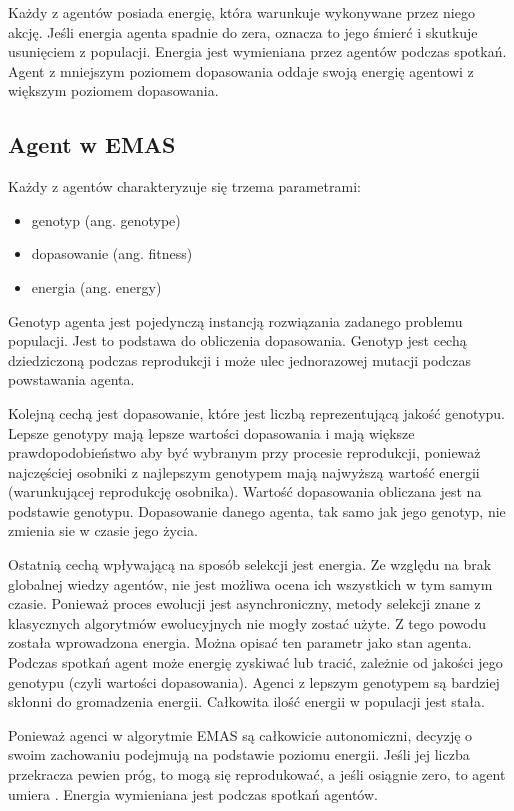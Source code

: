 Każdy z agentów posiada energię, która warunkuje wykonywane przez niego akcję. Jeśli energia agenta spadnie do zera, oznacza to jego śmierć i skutkuje usunięciem z populacji. Energia jest wymieniana przez agentów podczas spotkań. Agent z mniejszym poziomem dopasowania oddaje swoją energię agentowi z większym poziomem dopasowania.

\subsection*{Agent w EMAS}
\label{sec:agentgenetyczny}
Każdy z agentów charakteryzuje się trzema parametrami:
\begin {itemize}
\item genotyp (ang. genotype)
\item dopasowanie (ang. fitness)
\item energia (ang. energy)
\end {itemize}
Genotyp agenta jest pojedynczą instancją rozwiązania zadanego problemu populacji. Jest to podstawa do obliczenia dopasowania. Genotyp jest cechą dziedziczoną podczas reprodukcji i może ulec jednorazowej mutacji podczas powstawania agenta.

Kolejną cechą jest dopasowanie, które jest liczbą reprezentującą jakość genotypu. Lepsze genotypy mają lepsze wartości dopasowania i mają większe prawdopodobieństwo aby być wybranym przy procesie reprodukcji, ponieważ najczęściej osobniki z najlepszym genotypem mają najwyższą wartość energii (warunkującej reprodukcję osobnika). Wartość dopasowania obliczana jest na podstawie genotypu. Dopasowanie danego agenta, tak samo jak jego genotyp, nie zmienia sie w czasie jego życia.

Ostatnią cechą wpływającą na sposób selekcji jest energia. Ze względu na brak globalnej wiedzy agentów, nie jest możliwa ocena ich wszystkich w tym samym czasie. Ponieważ proces ewolucji jest asynchroniczny, metody selekcji znane z klasycznych algorytmów ewolucyjnych nie mogły zostać użyte. Z tego powodu została wprowadzona energia. Można opisać ten parametr jako stan agenta. Podczas spotkań agent może energię zyskiwać lub tracić, zależnie od jakości jego genotypu (czyli wartości dopasowania). Agenci z lepszym genotypem są bardziej skłonni do gromadzenia energii. Całkowita ilość energii w populacji jest stała.

Ponieważ agenci w algorytmie EMAS są całkowicie autonomiczni, decyzję o swoim zachowaniu podejmują na podstawie poziomu energii. Jeśli jej liczba przekracza pewien próg, to mogą się reprodukować, a jeśli osiągnie zero, to agent umiera \cite{emas3}. Energia wymieniana jest podczas spotkań agentów.



